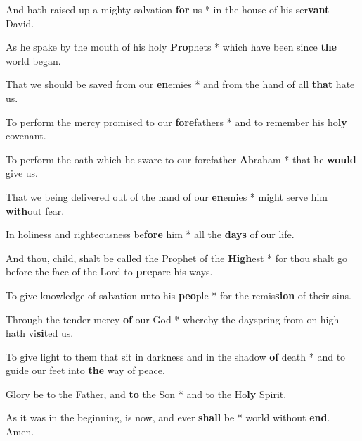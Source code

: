 \begin{multicols}{2}
	And hath raised up a mighty salvation \textbf{for} us * in the house of his ser\textbf{vant} David.
	
	As he spake by the mouth of his holy \textbf{Pro}phets *  which have been since \textbf{the} world began.
	
	That we should be saved from our \textbf{en}emies *  and from the hand of all \textbf{that} hate us.
	
	To perform the mercy promised to our \textbf{fore}fathers * and to remember his ho\textbf{ly} covenant.
	
	To perform the oath which he sware to our forefather \textbf{A}braham *  that he \textbf{would} give us.
	
	That we being delivered out of the hand of our \textbf{en}emies *  might serve him \textbf{with}out fear.
	
	In holiness and righteousness be\textbf{fore} him *  all the \textbf{days} of our life.
	
	And thou, child, shalt be called the Prophet of the \textbf{High}est * for thou shalt go before the face of the Lord to \textbf{pre}pare his ways.
	
	To give knowledge of salvation unto his \textbf{peo}ple *  for the remis\textbf{sion} of their sins.
	
	Through the tender mercy \textbf{of} our God * whereby the dayspring from on high hath vi\textbf{si}ted us.
	
	To give light to them that sit in darkness and in the shadow \textbf{of} death * and to guide our feet into \textbf{the} way of peace.
	
	Glory be to the Father, and \textbf{to} the Son *  and to the Ho\textbf{ly} Spirit.
	
	As it was in the beginning, is now, and ever \textbf{shall} be *  world without \textbf{end}. Amen.
\end{multicols}